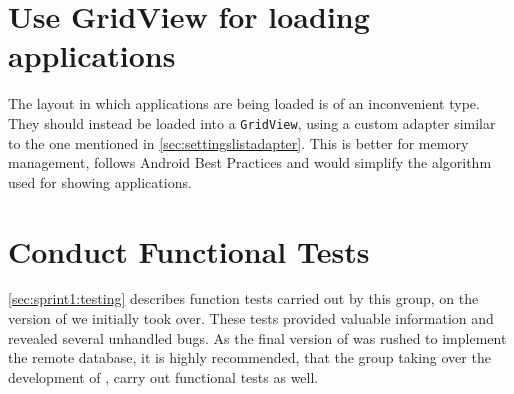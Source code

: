 \section{Use GridView for loading applications}
The layout in which applications are being loaded is of an inconvenient type. 
They should instead be loaded into a \lstinline|GridView|, using a custom adapter similar to the one mentioned in \cref{sec:settingslistadapter}. 
This is better for memory management, follows Android Best Practices and would simplify the algorithm used for showing applications. 

\section{Conduct Functional Tests}
\cref{sec:sprint1:testing} describes function tests carried out by this group, on the version of \launcher we initially took over.
These tests provided valuable information and revealed several unhandled bugs.
As the final version of \launcher was rushed to implement the remote database, it is highly recommended, that the group taking over the development of \launcher, carry out functional tests as well.